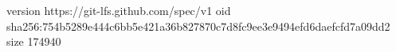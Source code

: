 version https://git-lfs.github.com/spec/v1
oid sha256:754b5289e444c6bb5e421a36b827870c7d8fc9ee3e9494efd6daefcfd7a09dd2
size 174940
